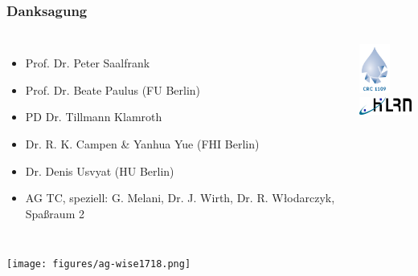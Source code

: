 \documentclass[hyperref={pdfpagelabels=false}]{beamer}
\begin{document}
\begin{frame}
 \frametitle{Danksagung}
 \begin{columns}
 \begin{itemize}
  \item Prof. Dr. Peter Saalfrank
  \item Prof. Dr. Beate Paulus (FU Berlin)
  \item PD Dr. Tillmann Klamroth
  \item Dr. R. K. Campen \& Yanhua Yue (FHI Berlin)
  \item Dr. Denis Usvyat (HU Berlin)
  \item AG TC, speziell: G. Melani, Dr. J. Wirth, Dr. R. W\l{}odarczyk, Spa\ss{}raum 2
 \end{itemize}
 \centering
\includegraphics[width=1cm]{figures/crc1109.png}
\\
\includegraphics[width=2cm]{figures/hlrn_logo.png}
\end{columns}
\centering
\texttt{[image: figures/ag-wise1718.png]}

\end{frame}

 
\end{document}
